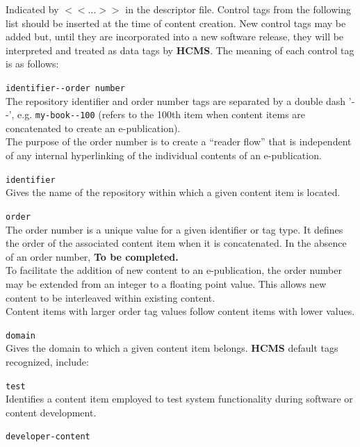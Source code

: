 \documentclass[12pt]{article}
\begin{document}
Indicated by {\small $<<\ldots>>$} in the descriptor file. Control tags from the following list should be inserted at the time of content creation. New control tags may be added but, until they are incorporated into a new software release, they will be interpreted and treated as data tags by {\bf \small HCMS}. The meaning of each control tag is as follows:

\begin{description}
\item {\tt identifier-{}-order number}\\
	The repository identifier and order number tags are separated by a double dash '-{}-', e.g. {\small \tt my-book-{}-100} (refers to the 100th item when content items are concatenated to create an e-publication).\\
	The purpose of the order number is to create a ``reader flow'' that is independent of any internal hyperlinking of the individual contents of an e-publication.
	\begin{description}
	\item {\tt identifier}\\
	Gives the name of the repository within which a given content item is located.
	\item {\tt order}\\
	The order number is a unique value for a given identifier or tag type. It defines the order of the associated content item when it is concatenated. In the absence of an order number, {\bf To be completed.}\\
	To facilitate the addition of new content to an e-publication, the order number may be extended from an integer to a floating point value. 	This allows new content to be interleaved within existing content.\\
	Content items with larger order tag values follow content items with lower  values.
	\end{description}
\item{\tt domain}\\
Gives the domain to which a given content item belongs. {\bf \small HCMS} default tags recognized, include:
	\begin{description}
	\item {\tt test}\\
	Identifies a content item employed to test system functionality during software or content development.
	\item {\tt developer-content}\\

\end{description}
\end{description}
\end{document}
